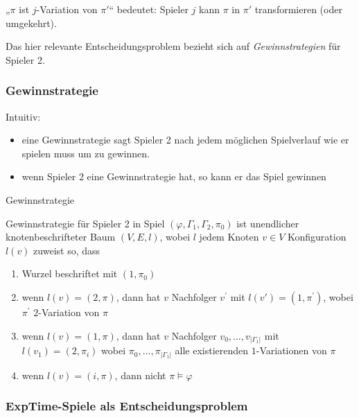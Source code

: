 „$\pi$ ist $j$-Variation von $\pi'$`` bedeutet: Spieler $j$ kann
$\pi$ in $\pi'$ transformieren (oder umgekehrt).

Das hier relevante Entscheidungsproblem bezieht sich auf \emph{Gewinnstrategien} für Spieler 2.

\subsubsection{Gewinnstrategie}\label{definition-5.8-gewinnstrategie}

Intuitiv:

\begin{itemize}
  \item eine Gewinnstrategie sagt Spieler 2 nach jedem möglichen Spielverlauf wie er spielen muss um zu gewinnen.
  \item wenn Spieler 2 eine Gewinnstrategie hat, so kann er das Spiel gewinnen
\end{itemize}

\begin{definition}{Gewinnstrategie}

Gewinnstrategie für Spieler 2 in Spiel
$\left( \varphi,\Gamma_{1},\Gamma_{2},\pi_{0} \right)$ ist unendlicher
knotenbeschrifteter Baum $(V,E,l)$, wobei $l$ jedem Knoten
$v \in V$ Konfiguration $l(v)$ zuweist so, dass

\begin{enumerate}
\def\labelenumi{\alph{enumi})}
\item
  Wurzel beschriftet mit $\left( 1,\pi_{0} \right)$
\item
  wenn $l\left( v \right) = (2,\pi)$, dann hat $v$ Nachfolger
  $v^{'}$ mit $l\left( v' \right) = \left( 1,\pi^{'} \right)$, wobei
  $\pi^{'}$ $2$-Variation von $\pi$
\item
  wenn $l\left( v \right) = (1,\pi)$, dann hat $v$ Nachfolger
  $v_{0},\ldots,v_{\left| \Gamma_{1} \right|}$ mit
  $l\left( v_{1} \right) = (2,\pi_{i})$ wobei
  $\pi_{0},\ldots,\pi_{\left| \Gamma_{1} \right|}$ alle existierenden
  $1$-Variationen von $\pi$
\item
  wenn $l\left( v \right) = (i,\pi)$, dann nicht
  $\pi \vDash \varphi$
\end{enumerate}
\end{definition}

\subsubsection{ExpTime-Spiele als Entscheidungsproblem}

